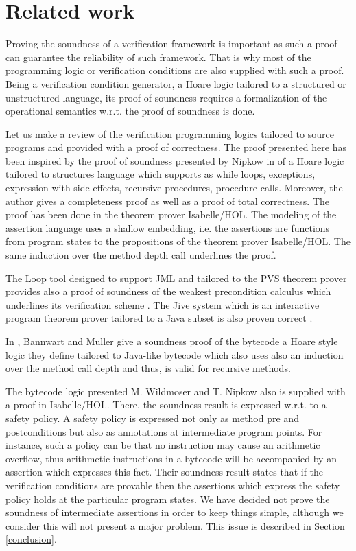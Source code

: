 \section{Related work}\label{proof:relWork}

Proving the soundness of a verification framework is important as such a proof 
can guarantee the reliability of such framework. That is why most of the programming logic
or verification conditions are also supplied with such a proof. 
Being  a verification condition generator, a Hoare logic tailored to a structured or unstructured language, 
 its proof of soundness requires a formalization of the operational semantics  w.r.t. the proof of soundness is done.  

 Let us make a review of the verification programming logics tailored to source programs and provided with a proof
 of correctness. The proof presented here has been inspired by the proof of soundness presented by Nipkow in \cite{Nipkow-MOD2001}
 of a Hoare logic tailored to structures language which supports as while loops, exceptions, expression with side effects,
 recursive procedures, procedure calls. Moreover, the author gives a completeness proof  as well as a proof of  total correctness.
  The proof has been done in the theorem prover Isabelle/HOL. The modeling of the 
 assertion language uses a  shallow embedding, i.e. the assertions are functions from program states to 
  the propositions of the theorem prover Isabelle/HOL. The same induction over the method depth call underlines the proof. 

 The Loop tool designed to support JML and tailored to the PVS theorem prover
  provides also a proof of soundness of the weakest precondition calculus which underlines
 its verification scheme \cite{Jacobs04WPJ}. The Jive system which is an interactive program theorem prover tailored to a Java subset is
 also  proven correct \cite{MH00Arc}.
   
 In \cite{BannwartMueller05}, Bannwart and Muller  give a soundness proof of the bytecode a Hoare style
 logic they define tailored to Java-like bytecode  which also uses also an induction over the method call depth and
 thus, is valid for recursive methods. 

 The bytecode logic presented  M. Wildmoser and T. Nipkow \cite{WildmoserN-ESOP05} also is supplied with a proof in Isabelle/HOL. There, the soundness
 result is expressed w.r.t. to a safety policy. A safety policy is expressed not only as method pre and postconditions but also as 
annotations at intermediate  program  points. For instance, such a policy can be that no instruction may cause an arithmetic overflow, thus
arithmetic instructions in a bytecode will be accompanied by an assertion which expresses this fact.
Their soundness result states that if the verification conditions are provable then
 the assertions which express the safety policy holds at the particular program states. 
We have decided not prove the soundness of intermediate assertions in order to keep things simple,
 although we consider this will not present a major problem. This issue is described in Section \ref{conclusion}.

